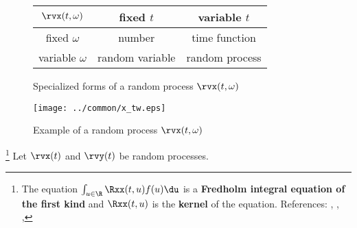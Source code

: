 \begin{figure}[ht]\color{figcolor}
\begin{center}
   \begin{tabular}{|c||c|c|}
      \hline
         $\rvx(t,\omega)$ &  fixed $t$      & variable $t$   \\
      \hline
      \hline
         fixed    $\omega$ & number          & time function  \\
      \hline
         variable $\omega$ & random variable & random process \\
      \hline
   \end{tabular}
\caption{
   Specialized forms of a random process $\rvx(t,\omega)$
   \label{fig:X(t,w)}
   }
\end{center}
\end{figure}

\begin{figure}[ht]\color{figcolor}
\begin{center}
\texttt{[image: ../common/x\_tw.eps]}
\end{center}
\caption{
  Example of a random process $\rvx(t,\omega)$
  \label{fig:X(t,w)graph}
}
\end{figure}


\begin{definition}
\footnote{
   The equation $\int_{u\in\R}\Rxx(t,u) f(u) \du$ is a
   \textbf{Fredholm integral equation of the first kind} and
   $\Rxx(t,u)$ is the \textbf{kernel} of the equation.
   References: 
     ,
     ,
     ,
   }
\label{def:Rxx}
\label{def:opR}
\label{def:Rxy}
Let $\rvx(t)$ and $\rvy(t)$ be random processes.\\
\end{definition}

